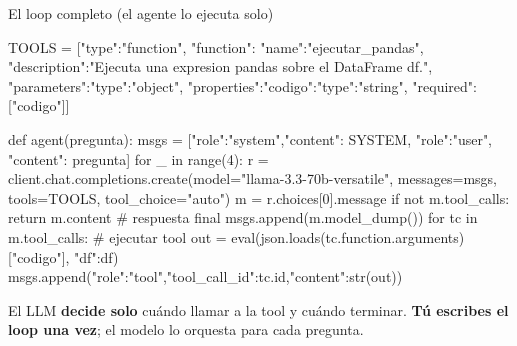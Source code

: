 \documentclass[aspectratio=169, 11pt]{beamer}
\begin{document}
\begin{frame}{El loop completo (el agente lo ejecuta solo)}
  \begin{pyblock}
TOOLS = [{"type":"function", "function":{
    "name":"ejecutar_pandas",
    "description":"Ejecuta una expresion pandas sobre el DataFrame df.",
    "parameters":{"type":"object",
                  "properties":{"codigo":{"type":"string"}},
                  "required":["codigo"]}}}]

def agent(pregunta):
    msgs = [{"role":"system","content": SYSTEM},
            {"role":"user",  "content": pregunta}]
    for _ in range(4):
        r = client.chat.completions.create(model="llama-3.3-70b-versatile",
            messages=msgs, tools=TOOLS, tool_choice="auto")
        m = r.choices[0].message
        if not m.tool_calls: return m.content          # respuesta final
        msgs.append(m.model_dump())
        for tc in m.tool_calls:                         # ejecutar tool
            out = eval(json.loads(tc.function.arguments)["codigo"], {"df":df})
            msgs.append({"role":"tool","tool_call_id":tc.id,"content":str(out)})
  \end{pyblock}
  \vspace{2pt}
  {\footnotesize\color{arcaDark}
  El LLM \textbf{decide solo} cuándo llamar a la tool y cuándo terminar.
  \textbf{Tú escribes el loop una vez}; el modelo lo orquesta para cada pregunta.}
\end{frame}
\end{document}
